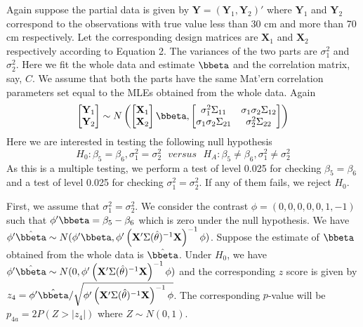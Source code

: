 \documentclass[]{article}
\begin{document}
Again suppose the partial data is given by \(\mathbf{Y} = (\mathbf{Y}_1, \mathbf{Y}_2)'\) where \(\mathbf{Y}_1\) and \(\mathbf{Y}_2\) correspond to the observations with true value less than 30 cm and more than 70 cm respectively. Let the corresponding design matrices are \(\mathbf{X}_1\) and \(\mathbf{X}_2\) respectively according to Equation 2. The variances of the two parts are \(\sigma_1^2\) and \(\sigma_2^2\). Here we fit the whole data and estimate \(\bbeta\) and the correlation matrix, say, \(C\). We assume that both the parts have the same Mat'ern correlation parameters set equal to the MLEs obtained from the whole data. Again
\[
\begin{bmatrix}
    \mathbf{Y}_1 \\
    \mathbf{Y}_2
\end{bmatrix}
\sim N \left(
\begin{bmatrix}
    \mathbf{X}_1 \\
    \mathbf{X}_2
\end{bmatrix}
\bbeta, 
\begin{bmatrix}
    \sigma_1^2 \Sigma_{11} & \sigma_1 \sigma_2  \Sigma_{12} \\
    \sigma_1 \sigma_2 \Sigma_{21} & \sigma_2^2 \Sigma_{22}
\end{bmatrix}
 \right)
\]
Here we are interested in testing the following null hypothesis
\[H_0: \beta_5 = \beta_6, \sigma_1^2 = \sigma_2^2 ~~~ versus~~~ H_A: \beta_5 \neq \beta_6, \sigma_1^2 \neq \sigma_2^2\]
As this is a multiple testing, we perform a test of level 0.025 for checking \(\beta_5 = \beta_6\) and a test of level 0.025 for checking \(\sigma_1^2 = \sigma_2^2\). If any of them fails, we reject \(H_0\).

First, we assume that \(\sigma_1^2 = \sigma_2^2\). We consider the contrast \(\phi = (0, 0, 0, 0, 0, 1, -1)\) such that \(\phi' \bbeta = \beta_5 - \beta_6\) which is zero under the null hypothesis. We have \(\phi'\hat{\bbeta} \sim N(\phi'\bbeta, \phi' \left(\mathbf{X}' \Sigma(\hat{\theta})^{-1} \mathbf{X} \right)^{-1} \phi)\). Suppose the estimate of \(\bbeta\) obtained from the whole data is \(\hat{\bbeta}\). Under \(H_0\), we have \(\phi'\hat{\bbeta} \sim N(0, \phi' \left(\mathbf{X}' \Sigma(\hat{\theta})^{-1} \mathbf{X} \right)^{-1} \phi)\) and the corresponding \(z\) score is given by \(z_4 = \phi'\hat{\bbeta} / \sqrt{\phi' \left(\mathbf{X}' \Sigma(\hat{\theta})^{-1} \mathbf{X} \right)^{-1} \phi}\). The corresponding \(p\)-value will be \(p_{4a} = 2P(Z > |z_4|)\) where \(Z \sim N(0, 1)\).
\end{document}
